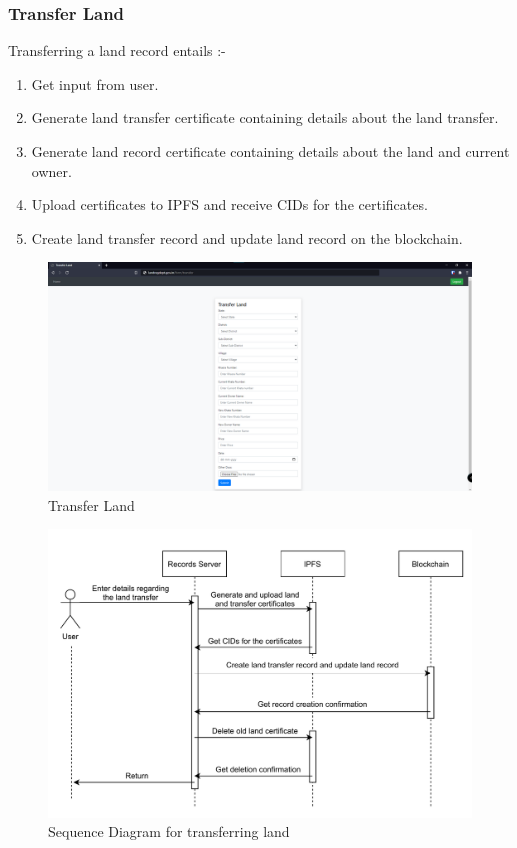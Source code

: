 \documentclass{article}
\begin{document}
        \subsubsection{Transfer Land}
            Transferring a land record entails :-
            \begin{enumerate}
                \item Get input from user.
                \item Generate land transfer certificate containing details about the land transfer.
                \item Generate land record certificate containing details about the land and current owner.
                \item Upload certificates to IPFS and receive CIDs for the certificates.
                \item Create land transfer record and update land record on the blockchain.
            \end{enumerate}
            \begin{figure}[htbp]
                \includegraphics[scale=0.25]{records_transfer}
                \centering
                \caption{Transfer Land}
            \end{figure}

            \begin{figure}[htbp]
                \includegraphics[scale=0.25]{records_seq_transfer}
                \centering
                \caption{Sequence Diagram for transferring land}
            \end{figure}
\end{document}
